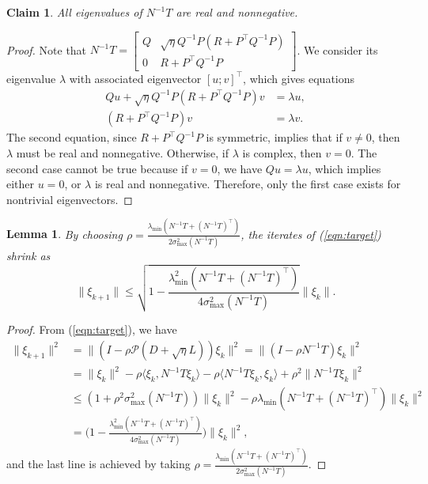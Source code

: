 \documentclass[11pt]{article}
\newtheorem{lemma}[theorem]{Lemma}
\newtheorem{claim}[theorem]{Claim}
\newcommand{\1}{\mathds{1}}
\begin{document}
\begin{claim}
    All eigenvalues of $N^{-1}T$ are real and nonnegative.
\end{claim}
\begin{proof}
    Note that $N^{-1}T = \begin{bmatrix}
        Q & \sqrt{\eta} Q^{-1}P(R+P^\top Q^{-1} P)\\
        0 &  R+P^\top Q^{-1} P 
    \end{bmatrix}$. We consider its eigenvalue $\lambda$ with associated eigenvector $[u;v]^\top$, which gives equations
    \begin{align}
        Qu + \sqrt{\eta} Q^{-1}P(R+P^\top Q^{-1} P)v &= \lambda u,\\
        (R+P^\top Q^{-1} P)v &= \lambda v.
    \end{align}
    The second equation, since $R+P^\top Q^{-1} P$ is symmetric, implies that if $v\neq 0 $, then $\lambda$ must be real and nonnegative. Otherwise, if $\lambda$ is complex, then $v=0$. The second case cannot be true because if $v=0$, we have $Qu = \lambda u$, which implies either $u=0$, or $\lambda$ is real and nonnegative. Therefore, only the first case exists for nontrivial eigenvectors.
\end{proof}
\begin{lemma}
    By choosing $\rho  = \frac{\lambda_{\min}(N^{-1}T+(N^{-1}T)^\top)}{2\sigma_{\max}^2(N^{-1}T)}$, the iterates of (\ref{eqn:target}) shrink as 
    \begin{equation}
        \|\xi_{k+1}\|\leq \sqrt{1- \frac{\lambda_{\min}^2(N^{-1}T+(N^{-1}T)^\top)}{4\sigma_{\max}^2(N^{-1}T)}}\|\xi_k\|.
    \end{equation}
\end{lemma}
\begin{proof}
From (\ref{eqn:target}), we have
\begin{equation}
    \begin{aligned}
          \|\xi_{k+1}\|^2 &= \|(I-\rho \mathcal{P}(D+\sqrt{\eta}L))\xi_{k}\|^2 = \|(I-\rho N^{-1}T)\xi_{k}\|^2 \\
          & = \|\xi_k\|^2-\rho \langle\xi_k,N^{-1}T \xi_k\rangle- \rho \langle N^{-1}T\xi_k, \xi_k\rangle+ \rho^2 \|N^{-1}T\xi_k\|^2\\
          &\leq (1+\rho^2\sigma_{\max}^2(N^{-1}T))\|\xi_k\|^2 - \rho\lambda_{\min}(N^{-1}T+(N^{-1}T)^\top)\|\xi_k\|^2\\
          &= \Big(1- \frac{\lambda_{\min}^2(N^{-1}T+(N^{-1}T)^\top)}{4\sigma_{\max}^2(N^{-1}T)}\Big)\|\xi_k\|^2,
    \end{aligned}
\end{equation}
and the last line is achieved by taking $\rho = \frac{\lambda_{\min}(N^{-1}T+(N^{-1}T)^\top)}{2\sigma_{\max}^2(N^{-1}T)}$. 
\end{proof}
\end{document}
